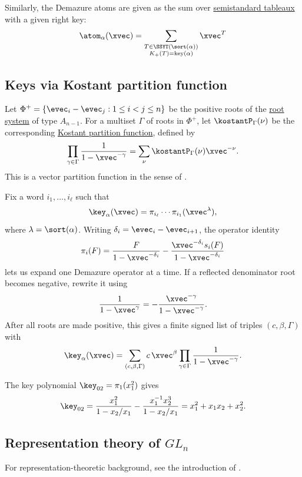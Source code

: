 Similarly, the Demazure atoms are given as the sum over
\hyperref[prelimTableaux]{semistandard tableaux} with a given right key:
\[
  \atom_\alpha(\xvec) =
  \sum_{\substack{T \in \SSYT(\sort(\alpha)) \\ K_+(T) = \mathrm{key}(\alpha)}} \xvec^T
\]



\subsection[keyFromKostant]{Keys via Kostant partition function}

Let $\Phi^+=\{ \evec_i-\evec_j : 1 \leq i < j \leq n\}$ be the positive roots of the
\hyperref[rootSystem]{root system} of type $A_{n-1}$.
For a multiset $\Gamma$ of roots in $\Phi^+$, let $\kostantP_\Gamma(\nu)$ be the
corresponding \hyperref[kostantPartitionFunction]{Kostant partition function},
defined by
\[
\prod_{\gamma \in \Gamma} \frac{1}{1-\xvec^{-\gamma}}
= \sum_{\nu} \kostantP_\Gamma(\nu)\xvec^{-\nu}.
\]
This is a vector partition function in the sense of \cite{Sturmfels1995}.

Fix a word $i_1,\dotsc,i_\ell$ such that
\[
 \key_\alpha(\xvec)=\pi_{i_\ell}\dotsm\pi_{i_1}(\xvec^\lambda),
\]
where $\lambda=\sort(\alpha)$.
Writing $\delta_i=\evec_i-\evec_{i+1}$, the operator identity
\[
\pi_i(F)= \frac{F}{1-\xvec^{-\delta_i}} - \frac{\xvec^{-\delta_i}s_i(F)}{1-\xvec^{-\delta_i}}
\]
lets us expand one Demazure operator at a time.
If a reflected denominator root becomes negative, rewrite it using
\[
\frac{1}{1-\xvec^\gamma} = -\frac{\xvec^{-\gamma}}{1-\xvec^{-\gamma}}.
\]
After all roots are made positive, this gives a finite signed list of triples
$(c,\beta,\Gamma)$ with
\[
\key_\alpha(\xvec) = \sum_{(c,\beta,\Gamma)} c\,\xvec^\beta \prod_{\gamma \in \Gamma}\frac{1}{1-\xvec^{-\gamma}}.
\]

\begin{example}
The key polynomial $\key_{02}=\pi_1(x_1^2)$ gives
\[
\key_{02}
=
\frac{x_1^2}{1-x_2/x_1}
-
\frac{x_1^{-1}x_2^3}{1-x_2/x_1}
=x_1^2+x_1x_2+x_2^2.
\]
\end{example}



\subsection[keyRepresentation]{Representation theory of $GL_n$}

For representation-theoretic background, see the introduction of
\cite{FanGuoPengSun2020}.

